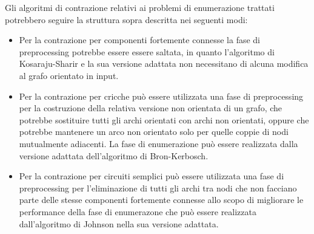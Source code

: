 Gli algoritmi di contrazione relativi ai problemi di enumerazione trattati potrebbero seguire la struttura sopra
descritta nei seguenti modi:
\begin{itemize}
    \item Per la contrazione per componenti fortemente connesse la fase di preprocessing potrebbe essere
    essere saltata, in quanto l'algoritmo di Kosaraju-Sharir e la sua versione adattata non necessitano di alcuna
    modifica al grafo orientato in input.
    \item Per la contrazione per cricche può essere utilizzata una fase di preprocessing per la costruzione
    della relativa versione non orientata di un grafo, che potrebbe sostituire tutti gli archi orientati con
    archi non orientati, oppure che potrebbe mantenere un arco non orientato solo per quelle coppie di nodi
    mutualmente adiacenti.
    La fase di enumerazione può essere realizzata dalla versione adattata dell'algoritmo di Bron-Kerbosch.
    \item Per la contrazione per circuiti semplici pu\`o essere utilizzata una fase di preprocessing per
    l'eliminazione di tutti gli archi tra nodi che non facciano parte delle stesse componenti fortemente connesse
    allo scopo di migliorare le performance della fase di enumerazone che può essere realizzata dall'algoritmo
    di Johnson nella sua versione adattata.
\end{itemize}